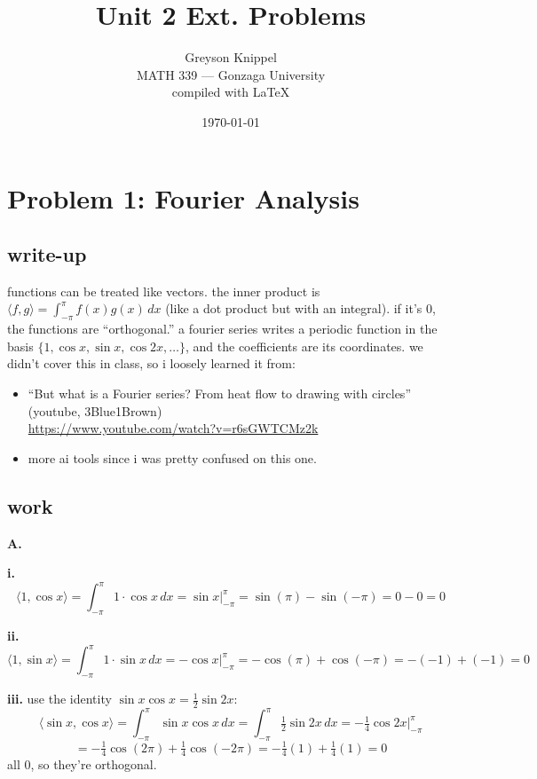 \documentclass{article}
\title{Unit 2 Ext. Problems}
\author{
Greyson Knippel \\[4pt]
MATH 339 --- Gonzaga University \\[4pt]
compiled with \LaTeX{}
}
\date{\today}
\begin{document}
\maketitle

\section*{Problem 1: Fourier Analysis}

\subsection*{write-up}

functions can be treated like vectors. the inner product is $\langle f,g\rangle = \int_{-\pi}^{\pi} f(x)g(x)\,dx$
(like a dot product but with an integral). if it's 0, the functions are ``orthogonal.''
a fourier series writes a periodic function in the basis $\{1, \cos x, \sin x, \cos 2x, \dots\}$, and the
coefficients are its coordinates. we didn't cover this in class, so i loosely learned it from:

\begin{itemize}
  \item ``But what is a Fourier series? From heat flow to drawing with circles'' (youtube, 3Blue1Brown) \\
        \url{https://www.youtube.com/watch?v=r6sGWTCMz2k}
  \item more ai tools since i was pretty confused on this one.
\end{itemize}

\subsection*{work}

\textbf{A.}

\textbf{i.}
\[
\langle 1, \cos x\rangle = \int_{-\pi}^{\pi} 1 \cdot \cos x\,dx = \sin x\Big|_{-\pi}^{\pi} = \sin(\pi) - \sin(-\pi) = 0 - 0 = \boxed{0}
\]

\textbf{ii.}
\[
\langle 1, \sin x\rangle = \int_{-\pi}^{\pi} 1 \cdot \sin x\,dx = -\cos x\Big|_{-\pi}^{\pi} = -\cos(\pi) + \cos(-\pi) = -(-1) + (-1) = \boxed{0}
\]

\textbf{iii.} use the identity $\sin x \cos x = \tfrac12 \sin 2x$:
\[
\langle \sin x, \cos x\rangle = \int_{-\pi}^{\pi} \sin x\cos x\,dx = \int_{-\pi}^{\pi} \tfrac12 \sin 2x\,dx
= -\tfrac14\cos 2x\Big|_{-\pi}^{\pi}
\]
\[
= -\tfrac14\cos(2\pi) + \tfrac14\cos(-2\pi) = -\tfrac14(1) + \tfrac14(1) = \boxed{0}
\]
all 0, so they're orthogonal.
\end{document}
